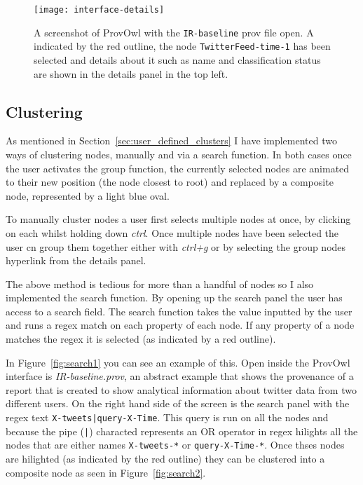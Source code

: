 \begin{figure}[h]
	\centering
	\texttt{[image: interface-details]}
	\caption{A screenshot of ProvOwl with the \texttt{IR-baseline} prov file open. A indicated by the red outline, the node \texttt{TwitterFeed-time-1} has been selected and details about it such as name and classification status are shown in the details panel in the top left.}
	\label{fig:interface-details}
\end{figure}

\subsection{Clustering}
\label{sec:clustering}

As mentioned in Section~\ref{sec:user_defined_clusters} I have implemented two ways of clustering nodes, manually and via a search function. In both cases once the user activates the group function, the currently selected nodes are animated to their new position (the node closest to root) and replaced by a composite node, represented by a light blue oval. 

To manually cluster nodes a user first selects multiple nodes at once, by clicking on each whilst holding down \textit{ctrl}. Once multiple nodes have been selected the user cn group them together either with \textit{ctrl+g} or by selecting the group nodes hyperlink from the details panel.

The above method is tedious for more than a handful of nodes so I also implemented the search function. By opening up the search panel the user has access to a search field. The search function takes the value inputted by the user and runs a regex match on each property of each node. If any property of a node matches the regex it is selected (as indicated by a red outline).

In Figure~\ref{fig:search1} you can see an example of this. Open inside the ProvOwl interface is \textit{IR-baseline.prov}, an abstract example that shows the provenance of a report that is created to show analytical information about twitter data from two different users. On the right hand side of the screen is the search panel with the regex text \texttt{X-tweets|query-X-Time}. This query is run on all the nodes and because the pipe (\texttt{|}) characted represents an OR operator in regex hilights all the nodes that are either names \texttt{X-tweets-*} or \texttt{query-X-Time-*}. Once thses nodes are hilighted (as indicated by the red outline) they can be clustered into a composite node as seen in Figure~\ref{fig:search2}.


